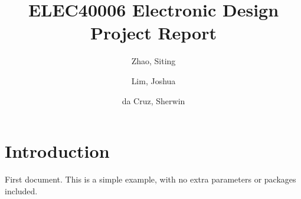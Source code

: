 \documentclass{report}
\title{ELEC40006 Electronic Design Project Report}
\author{
Zhao, Siting
\and
Lim, Joshua
\and
da Cruz, Sherwin
}
\begin{document}
\maketitle
\section{Introduction}

First document. This is a simple example, with no 
extra parameters or packages included.
\end{document}
